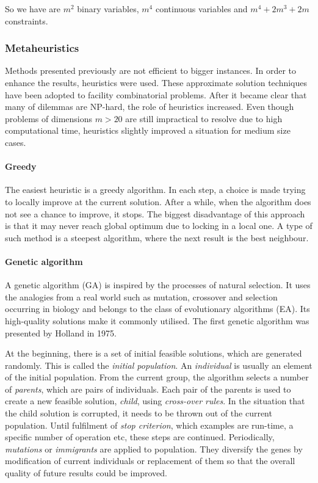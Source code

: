 So we have are $m^2$ binary variables, $m^4$ continuous variables and $m^4+2m^3+2m$ constraints.

\subsubsection{Metaheuristics}
Methods presented previously are not efficient to bigger instances.
In order to enhance the results, heuristics were used.
These approximate solution techniques have been adopted to facility combinatorial problems.
After it became clear that many of dilemmas are NP-hard, the role of heuristics increased.
Even though problems of dimensions $m > 20$ are still impractical to resolve due to high computational time, heuristics slightly improved a situation for medium size cases.

\paragraph{Greedy}

The easiest heuristic is a greedy algorithm.
In each step, a choice is made trying to locally improve at the current solution.
After a while, when the algorithm does not see a chance to improve, it stops.
The biggest disadvantage of this approach is that it may never reach global optimum due to locking in a local one. A type of such method is a steepest algorithm, where the next result is the best neighbour.


\paragraph{Genetic algorithm}

A genetic algorithm (GA) is inspired by the processes of natural selection.
It uses the analogies from a real world such as mutation, crossover and selection occurring in biology and belongs to the class of evolutionary algorithms (EA).
Its high-quality solutions make it commonly utilised.
The first genetic algorithm was presented by Holland \cite{holland1975adaptation} in 1975.

At the beginning, there is a set of initial feasible solutions, which are generated randomly.
This is called the \textit{initial population}.
An \textit{individual} is usually an element of the initial population.
From the current group, the algorithm selects a number of \textit{parents}, which are pairs of individuals.
Each pair of the parents is used to create a new feasible solution, \textit{child}, using \textit{cross-over rules}.
In the situation that the child solution is corrupted, it needs to be thrown out of the current population.
Until fulfilment of \textit{stop criterion}, which examples are run-time, a specific number of operation etc, these steps are continued.
Periodically, \textit{mutations} or \textit{immigrants} are applied to population.
They diversify the genes by modification of current individuals or replacement of them so that the overall quality of future results could be improved.

